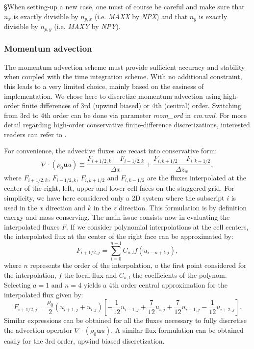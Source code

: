 \documentclass[12pt,A4,french]{article}
\begin{document}
§When setting-up a new case, one must of course be careful and make sure that $n_x$ is exactly divisible by $n_{p,x}$ (i.e. {\it MAXX} by {\it NPX}) and that $n_y$ is exactly divisible by $n_{p,y}$ (i.e. {\it MAXY} by {\it NPY}).

\subsubsection{Momentum advection}

The momentum advection scheme must provide sufficient accuracy and stability when coupled with the time integration scheme. With no additional constraint, this leads to a very 
limited choice, mainly based on the easiness of implementation. We chose here to discretize momentum advection using high-order finite differences of 3rd (upwind biased) or 4th (central) order. Switching from 3rd to 4th order can be done via parameter {\it mom\_ord} in {\it cm.nml}. For more detail regarding high-order conservative finite-difference discretizations, interested readers can refer to \cite{Mal1998}.

For convenience, the advective fluxes are recast into conservative form:
\begin{equation}
\nabla\cdot\left( \rho_0 \mathbf{u} u \right) \equiv \frac{F_{i+1/2,k} - F_{i-1/2,k}}{\Delta x} + \frac{F_{i,k+1/2} - F_{i,k-1/2}}{\Delta z_w},
\label{fluxes}
\end{equation}
where $F_{i+1/2,k}$, $F_{i-1/2,k}$, $F_{i,k+1/2}$ and $F_{i,k-1/2}$ are the fluxes interpolated at the center of the right, left, upper and lower cell faces on the staggered grid. For simplicity, we have here considered only a 2D system where the subscript $i$ is used in the $x$ direction and $k$ in the $z$ direction. This formulation is by definition energy and mass conserving. The main issue consists now in evaluating the interpolated fluxes $F$. If we consider polynomial interpolations at the cell centers, the interpolated flux at the center of the right face can be approximated by:
\begin{equation}
F_{i+1/2,j} = \sum_{l=0}^{n-1}C_{a,l}f\left(u_{i-a+l,j}\right),
\end{equation}
where $n$ represents the order of the interpolation, $a$ the first point considered for the interpolation, $f$ the local flux and $C_{a,l}$ the coefficients of the 
polynom. Selecting $a=1$ and $n=4$ yields a 4th order central approximation for the interpolated flux given by:
\begin{equation}
F_{i+1/2,j} = \frac{\rho_0}{2}\left(u_{i+1,j} + u_{i,j}\right)\left[-\frac{1}{12} u_{i-1,j} + \frac{7}{12} u_{i,j} + \frac{7}{12} u_{i+1,j} - \frac{1}{12} u_{i+2,j}\right].
\end{equation}
Similar expressions can be obtained for all the fluxes necessary to fully discretise the advection operator $\nabla\cdot\left( \rho_0 \mathbf{u} u \right)$. A similar flux formulation can be obtained easily for the 3rd order, upwind biased discretization.
\end{document}

